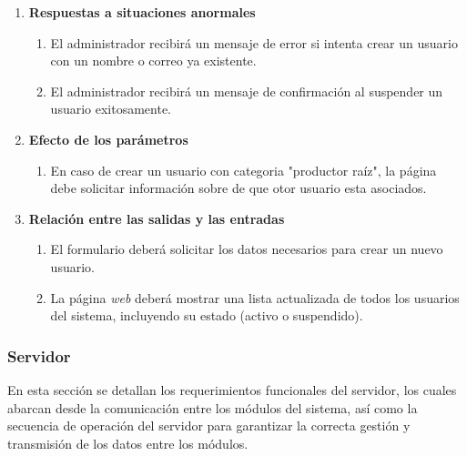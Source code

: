 \begin{enumerate}
\begin{enumerate}
                \item \textbf{Respuestas a situaciones anormales}
                    \begin{enumerate}
                        \item El administrador recibirá un mensaje de error si intenta crear un usuario con un nombre o correo ya existente.
                        \item El administrador recibirá un mensaje de confirmación al suspender un usuario exitosamente.
                    \end{enumerate}   
        
                \item \textbf{Efecto de los parámetros}
                    \begin{enumerate}
                        \item En caso de crear un usuario con categoria "productor raíz", la página debe solicitar información sobre de que otor usuario esta asociados.
                    \end{enumerate}   
            
                \item \textbf{Relación entre las salidas y las entradas}
                    \begin{enumerate}
                        \item El formulario deberá solicitar los datos necesarios para crear un nuevo usuario.
                        \item La página \textit{web} deberá mostrar una lista actualizada de todos los usuarios del sistema, incluyendo su estado (activo o suspendido).
                    \end{enumerate}
        \end{enumerate}

 \end{enumerate}

\subsubsection{Servidor}

En esta sección se detallan los requerimientos funcionales del servidor,
los cuales abarcan desde la comunicación entre los módulos del sistema,
así como la secuencia de operación del servidor para garantizar la correcta gestión
y transmisión de los datos entre los módulos.

